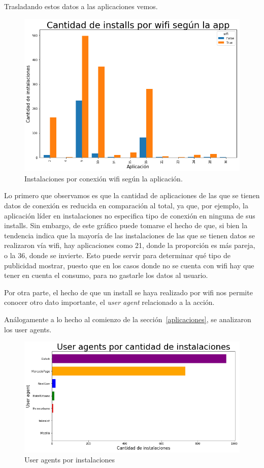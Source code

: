 \documentclass[a4paper, 12pt]{article}
\begin{document}
		Trasladando estos datos a las aplicaciones vemos.

		\FloatBarrier
		\begin{figure}[h]
			\centering
			\includegraphics[width=\textwidth]{images/installs/appswifi.png}
			\caption{Instalaciones por conexión wifi según la aplicación.}
		\end{figure}
		\FloatBarrier

		Lo primero que observamos es que la cantidad de aplicaciones de las que se tienen datos de conexión es reducida en comparación al total, ya que, por ejemplo, la aplicación líder en instalaciones no especifica tipo de conexión en ninguna de sus installs. Sin embargo, de este gráfico puede tomarse el hecho de que, si bien la tendencia indica que la mayoría de las instalaciones de las que se tienen datos se realizaron vía wifi, hay aplicaciones como 21, donde la proporción es más pareja, o la 36, donde se invierte. Esto puede servir para determinar qué tipo de publicidad mostrar, puesto que en los casos donde no se cuenta con wifi hay que tener en cuenta el consumo, para no gastarle los datos al usuario.


		Por otra parte, el hecho de que un install se haya realizado por wifi nos permite conocer otro dato importante, el \textit{user agent} relacionado a la acción.

		Análogamente a lo hecho al comienzo de la sección~\ref{aplicaciones}, se analizaron los user agents.

		\FloatBarrier
		\begin{figure}[h]
			\centering
			\includegraphics[width=\textwidth]{images/installs/useragents.png}
			\caption{User agents por instalaciones}
		\end{figure}
		\FloatBarrier
\end{document}
